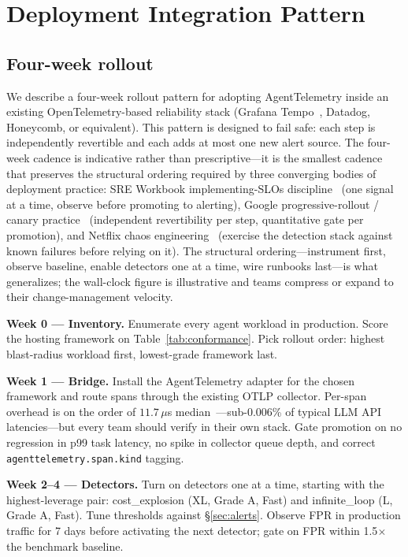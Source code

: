 \documentclass[conference]{IEEEtran}
\begin{document}
\section{Deployment Integration Pattern}
\label{sec:deployment}

\subsection{Four-week rollout}

We describe a four-week rollout pattern for adopting AgentTelemetry
inside an existing OpenTelemetry-based reliability stack (Grafana
Tempo~\cite{grafana_tempo}, Datadog, Honeycomb, or equivalent). This
pattern is designed to fail safe: each step is independently
revertible and each adds at most one new alert source. The
four-week cadence is indicative rather than prescriptive---it is
the smallest cadence that preserves the structural ordering required
by three converging bodies of deployment practice: SRE Workbook
implementing-SLOs discipline~\cite{sre_workbook} (one signal at a
time, observe before promoting to alerting), Google
progressive-rollout / canary practice~\cite{sre_book} (independent
revertibility per step, quantitative gate per promotion), and
Netflix chaos engineering~\cite{netflix_chaos} (exercise the
detection stack against known failures before relying on it). The
structural ordering---instrument first, observe baseline, enable
detectors one at a time, wire runbooks last---is what generalizes;
the wall-clock figure is illustrative and teams compress or expand
to their change-management velocity.

\noindent\textbf{Week 0 --- Inventory.}
Enumerate every agent workload in production. Score the hosting
framework on Table~\ref{tab:conformance}. Pick rollout order:
highest blast-radius workload first, lowest-grade framework last.

\noindent\textbf{Week 1 --- Bridge.}
Install the AgentTelemetry adapter for the chosen framework and
route spans through the existing OTLP collector. Per-span overhead
is on the order of $11.7\,\mu$s
median~\cite{agenttelemetry_aiware}---sub-0.006\% of typical LLM API
latencies---but every team should verify in their own stack. Gate
promotion on no regression in p99 task latency, no spike in
collector queue depth, and correct \texttt{agenttelemetry.span.kind}
tagging.

\noindent\textbf{Week 2--4 --- Detectors.}
Turn on detectors one at a time, starting with the highest-leverage
pair: cost\_explosion (XL, Grade A, Fast) and infinite\_loop (L,
Grade A, Fast). Tune thresholds against \S\ref{sec:alerts}. Observe
FPR in production traffic for 7 days before activating the next
detector; gate on FPR within 1.5$\times$ the benchmark baseline.
\end{document}
